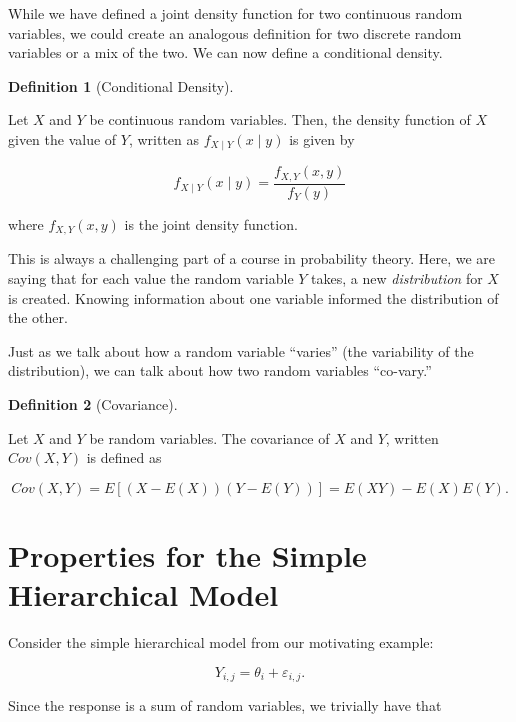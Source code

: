 \documentclass[
  letterpaper,
  DIV=11,
  numbers=noendperiod]{scrreprt}
\theoremstyle{definition}
\newtheorem{definition}{Definition}[chapter]
\theoremstyle{plain}
\theoremstyle{definition}
\theoremstyle{remark}
\begin{document}
While we have defined a joint density function for two continuous random
variables, we could create an analogous definition for two discrete
random variables or a mix of the two. We can now define a conditional
density.

\begin{definition}[Conditional
Density]\protect\hypertarget{def-conditional-density}{}\label{def-conditional-density}

Let \(X\) and \(Y\) be continuous random variables. Then, the density
function of \(X\) given the value of \(Y\), written as
\(f_{X \mid Y}(x \mid y)\) is given by

\[f_{X \mid Y}(x \mid y) = \frac{f_{X,Y}(x, y)}{f_Y(y)}\]

where \(f_{X,Y}(x,y)\) is the joint density function.

\end{definition}

This is always a challenging part of a course in probability theory.
Here, we are saying that for each value the random variable \(Y\) takes,
a new \emph{distribution} for \(X\) is created. Knowing information
about one variable informed the distribution of the other.

Just as we talk about how a random variable ``varies'' (the variability
of the distribution), we can talk about how two random variables
``co-vary.''

\begin{definition}[Covariance]\protect\hypertarget{def-covariance}{}\label{def-covariance}

Let \(X\) and \(Y\) be random variables. The covariance of \(X\) and
\(Y\), written \(Cov(X, Y)\) is defined as

\[Cov(X,Y) = E\left[(X - E(X))(Y - E(Y))\right] = E(XY) - E(X) E(Y).\]

\end{definition}

\section{Properties for the Simple Hierarchical
Model}\label{properties-for-the-simple-hierarchical-model}

Consider the simple hierarchical model from our motivating example:

\[Y_{i,j} = \theta_i + \varepsilon_{i,j}.\]

Since the response is a sum of random variables, we trivially have that
\end{document}
